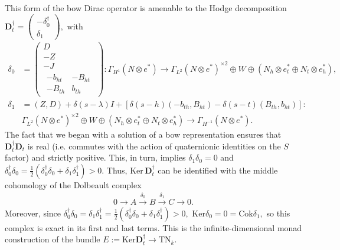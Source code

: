 \documentclass[12pt]{article}
\theoremstyle{definition}
\theoremstyle{remark}
\numberwithin{theorem}{section}
\begin{document}
This form of the bow Dirac operator is amenable to the Hodge decomposition $\mathbf{D}_t^\dagger=
\left(\begin{smallmatrix} 
-\delta_0^\dagger  \\  
\delta_1
\end{smallmatrix} \right),
$ with
\begin{align}
\delta_0&=
\begin{pmatrix}
D\\
-Z\\
-J\\
\begin{smallmatrix} 
-b_{ht} & -B_{ht}\\
-B_{th} & b_{th}  
\end{smallmatrix} 
\end{pmatrix}:
\Gamma_{H^1}(N\otimes e^*)\rightarrow 
\Gamma_{L^2}(N\otimes e^*)^{\times 2}\oplus W\oplus (N_h\otimes e_t^*
\oplus N_t\otimes e_h^*),
\\
\delta_1&=(Z, D)+\delta(s-\lambda) I+[\delta(s-h)(-b_{th},B_{ht})-\delta(s-t)(B_{th},b_{ht})]:\nonumber\\
&\Gamma_{L^2}(N\otimes e^*)^{\times 2}\oplus W\oplus (N_h\otimes e_t^* \oplus N_t\otimes e_h^*)\rightarrow\Gamma_{H^{-1}}(N\otimes e^*).
\end{align}
The fact that we began with a solution of a bow representation ensures that $\mathbf{D}_t^\dagger\mathbf{D}_t$ is real (i.e. commutes with the action of quaternionic identities on the $S$ factor) and strictly positive. This, in turn, implies $\delta_1\delta_0=0$ and $\delta_0^\dagger\delta_0=\frac{1}{2}(\delta_0^\dagger\delta_0+\delta_1\delta_1^\dagger)>0$.  Thus, $\mathrm{Ker}\, \mathbf{D}_t^\dagger$ can be identified with the middle cohomology of the Dolbeault complex
\begin{align}\label{FirstBowMonad}
0\rightarrow A\xrightarrow{\delta_0}B\xrightarrow{\delta_1}C\rightarrow 0.
\end{align}
Moreover, since $\delta_0^\dagger\delta_0=\delta_1\delta_1^\dagger=\frac{1}{2}(\delta_0^\dagger\delta_0+\delta_1\delta_1^\dagger)>0,$ $\mathrm{Ker} \delta_0=0=\mathrm{Cok} \delta_1,$ so this complex is exact in its first and last terms. This is the infinite-dimensional monad construction of the bundle $E:=\mathrm{Ker} \mathbf{D}_t^\dagger\rightarrow\mathrm{TN}_k$.
\end{document}
